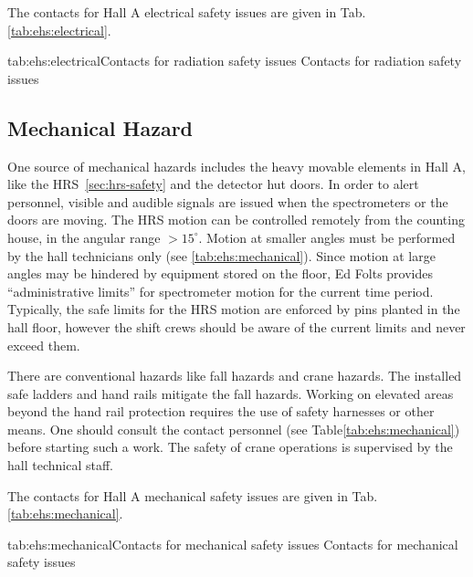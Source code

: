  The contacts for Hall A electrical safety issues are given in Tab.\ref{tab:ehs:electrical}.
 
 \begin{namestab}{tab:ehs:electrical}{Contacts for radiation safety issues}{%
   Contacts for radiation safety issues}
  \MarkStevens{}
 \end{namestab}

 
\begin{safetyen}{0}{0}
\section{Mechanical Hazard} 
\label{sec:mechhazard}
\end{safetyen}

 One source of mechanical hazards includes the heavy movable 
 elements in Hall A, like the HRS~\ref{sec:hrs-safety} and the detector hut doors.
 In order to alert personnel, visible and audible signals are issued when
 the spectrometers or the doors are moving.   
 The HRS motion can be controlled remotely from the counting house,
 in the angular range $>15^\circ$. Motion at smaller angles
 must be performed by the hall technicians only (see \ref{tab:ehs:mechanical}).
 Since motion at large angles may be hindered by equipment stored on the floor,
 Ed Folts provides ``administrative limits'' for spectrometer motion for
 the current time period. Typically, the safe limits for the HRS motion 
 are enforced by pins planted in the hall floor, however the shift crews should
 be aware of the current limits and never exceed them.

 There are conventional
 hazards like fall hazards and crane hazards. The installed safe ladders and hand rails
 mitigate the fall hazards. Working on elevated areas beyond the hand rail protection
 requires the use of safety harnesses or other means. One should consult the contact
 personnel (see Table\ref{tab:ehs:mechanical}) before starting such a work.
 The safety of crane operations is supervised by the hall technical staff. 

 The contacts for Hall A mechanical safety issues are given in Tab.\ref{tab:ehs:mechanical}.
 
 \begin{namestab}{tab:ehs:mechanical}{Contacts for mechanical safety issues}{%
   Contacts for mechanical safety issues}
  \MarkStevens{}
 \end{namestab}

